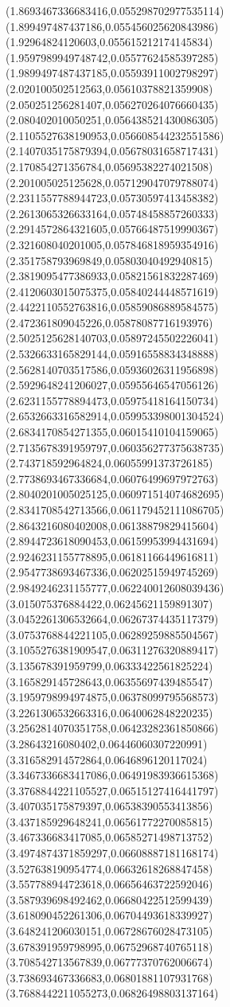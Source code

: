 {(1.8693467336683416,0.055298702977535114)
(1.899497487437186,0.055456025620843986)
(1.92964824120603,0.055615212174145834)
(1.9597989949748742,0.05577624585397285)
(1.9899497487437185,0.05593911002798297)
(2.020100502512563,0.05610378821359908)
(2.050251256281407,0.056270264076660435)
(2.080402010050251,0.056438521430086305)
(2.1105527638190953,0.056608544232551586)
(2.1407035175879394,0.05678031658717431)
(2.170854271356784,0.05695382274021508)
(2.201005025125628,0.057129047079788074)
(2.2311557788944723,0.05730597413458382)
(2.2613065326633164,0.05748458857260333)
(2.2914572864321605,0.05766487519990367)
(2.321608040201005,0.057846818959354916)
(2.351758793969849,0.05803040492940815)
(2.3819095477386933,0.05821561832287469)
(2.4120603015075375,0.05840244448571619)
(2.4422110552763816,0.05859086889584575)
(2.472361809045226,0.05878087716193976)
(2.5025125628140703,0.05897245502226041)
(2.5326633165829144,0.05916558834348888)
(2.5628140703517586,0.05936026311956898)
(2.5929648241206027,0.05955646547056126)
(2.6231155778894473,0.05975418164150734)
(2.6532663316582914,0.059953398001304524)
(2.6834170854271355,0.06015410104159065)
(2.7135678391959797,0.060356277375638735)
(2.743718592964824,0.06055991373726185)
(2.7738693467336684,0.06076499697972763)
(2.8040201005025125,0.060971514074682695)
(2.8341708542713566,0.061179452111086705)
(2.8643216080402008,0.06138879829415604)
(2.8944723618090453,0.06159953994431694)
(2.9246231155778895,0.06181166449616811)
(2.9547738693467336,0.06202515949745269)
(2.9849246231155777,0.062240012608039436)
(3.015075376884422,0.06245621159891307)
(3.0452261306532664,0.06267374435117379)
(3.0753768844221105,0.06289259885504567)
(3.1055276381909547,0.06311276320889417)
(3.135678391959799,0.06333422561825224)
(3.165829145728643,0.06355697439485547)
(3.1959798994974875,0.06378099795568573)
(3.2261306532663316,0.0640062848220235)
(3.2562814070351758,0.06423282361850866)
(3.28643216080402,0.06446060307220991)
(3.316582914572864,0.0646896120117024)
(3.3467336683417086,0.06491983936615368)
(3.3768844221105527,0.06515127416441797)
(3.407035175879397,0.06538390553413856)
(3.437185929648241,0.06561772270085815)
(3.467336683417085,0.06585271498713752)
(3.4974874371859297,0.06608887181168174)
(3.527638190954774,0.06632618268847458)
(3.557788944723618,0.06656463722592046)
(3.587939698492462,0.06680422512599439)
(3.618090452261306,0.06704493618339927)
(3.648241206030151,0.06728676028473105)
(3.678391959798995,0.06752968740765118)
(3.708542713567839,0.06777370762006674)
(3.738693467336683,0.06801881107931768)
(3.7688442211055273,0.06826498803137164)
}
